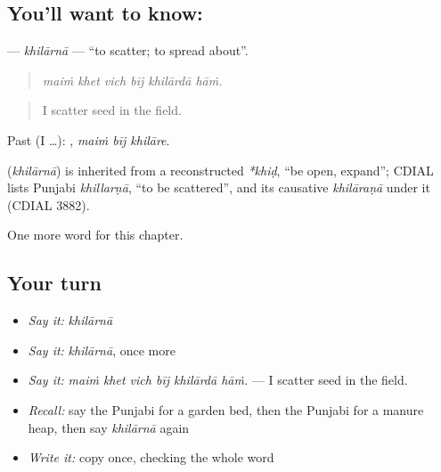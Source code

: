 \subsection*{You'll want to know: }
\textbf{} — \emph{khilārnā} — \textquotedblleft{}to scatter; to spread about\textquotedblright{}.

\begin{quote}
     
\end{quote}

\begin{quote}
\emph{maiṁ khet vich bīj khilārdā hāṁ.}
\end{quote}

\begin{quote}
I scatter seed in the field.
\end{quote}

Past (I …):   , \emph{maiṁ bīj khilāre}.

\begin{cousinweb}
\textbf{} (\emph{khilārnā}) is inherited from a reconstructed \emph{*khiḍ}, \textquotedblleft{}be open, expand\textquotedblright{}; CDIAL lists Punjabi \emph{khillarṇā}, \textquotedblleft{}to be scattered\textquotedblright{}, and its causative \emph{khilāraṇā} under it (CDIAL 3882).
\end{cousinweb}

\begin{grammarlens}[title={What you've built}]
One more word for this chapter.
\end{grammarlens}

\subsection*{Your turn}
\begin{itemize}
\raggedright
  \item \emph{Say it:} \emph{khilārnā}
  \item \emph{Say it:} \emph{khilārnā}, once more
  \item \emph{Say it:} \emph{maiṁ khet vich bīj khilārdā hāṁ.} — I scatter seed in the field.
  \item \emph{Recall:} say the Punjabi for a garden bed, then the Punjabi for a manure heap, then say \emph{khilārnā} again
  \item \emph{Write it:} copy \textbf{} once, checking the whole word
\end{itemize}

